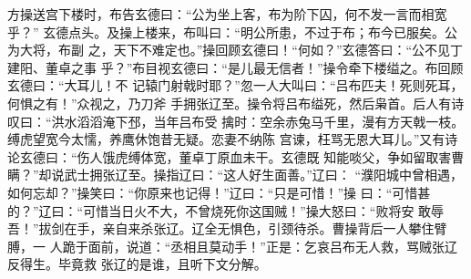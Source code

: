 方操送宫下楼时，布告玄德曰：“公为坐上客，布为阶下囚，何不发一言而相宽乎？”
玄德点头。及操上楼来，布叫曰：“明公所患，不过于布；布今已服矣。公为大将，布副
之，天下不难定也。”操回顾玄德曰！“何如？”玄德答曰：“公不见丁建阳、董卓之事
乎？”布目视玄德曰：“是儿最无信者！”操令牵下楼缢之。布回顾玄德曰：“大耳儿！不
记辕门射戟时耶？”忽一人大叫曰：“吕布匹夫！死则死耳，何惧之有！”众视之，乃刀斧
手拥张辽至。操令将吕布缢死，然后枭首。后人有诗叹曰：“洪水滔滔淹下邳，当年吕布受
擒时：空余赤兔马千里，漫有方天戟一枝。缚虎望宽今太懦，养鹰休饱昔无疑。恋妻不纳陈
宫谏，枉骂无恩大耳儿。”又有诗论玄德曰：“伤人饿虎缚体宽，董卓丁原血未干。玄德既
知能啖父，争如留取害曹瞒？”却说武士拥张辽至。操指辽曰：“这人好生面善。”辽曰：
“濮阳城中曾相遇，如何忘却？”操笑曰：“你原来也记得！”辽曰：“只是可惜！”操
曰：“可惜甚的？”辽曰：“可惜当日火不大，不曾烧死你这国贼！”操大怒曰：“败将安
敢辱吾！”拔剑在手，亲自来杀张辽。辽全无惧色，引颈待杀。曹操背后一人攀住臂膊，一
人跪于面前，说道：“丞相且莫动手！”正是：乞哀吕布无人救，骂贼张辽反得生。毕竟救
张辽的是谁，且听下文分解。